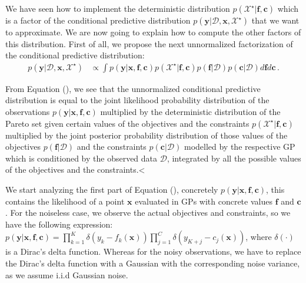 We have seen how to implement the deterministic  distribution $p(\mathcal{X}^{\star}|\textbf{f},\textbf{c})$ which is a factor of the conditional predictive distribution $p(\textbf{y}|\mathcal{D}, \textbf{x}, \mathcal{X}^{\star})$ that we want to approximate. We are now going to explain how to compute the other factors of this distribution. First of all, we propose the next unnormalized factorization of the conditional predictive distribution:
\begin{align}
p(\textbf{y}|\mathcal{D}, \textbf{x}, \mathcal{X}^{\star}) & \propto 
        \int p(\textbf{y}|\textbf{x},\textbf{f},\textbf{c}) 
        p(\mathcal{X}^{\star}|\textbf{f},\textbf{c}) p(\textbf{f}|\mathcal{D}) p(\textbf{c}|\mathcal{D})
 d\textbf{f} d\textbf{c} 
        \label{eq:exact_acq1}\,.
\end{align}

From Equation (\label{eq:exact_acq1}), we see that the unnormalized conditional predictive distribution is equal to the joint likelihood probability distribution of the observations $p(\textbf{y}|\textbf{x},\textbf{f},\textbf{c})$ multiplied by the deterministic distribution of the Pareto set given certain values of the objectives and the constraints $p(\mathcal{X}^{\star}|\textbf{f},\textbf{c})$ multiplied by the joint posterior probability distribution of those values of the objectives $p(\textbf{f}|\mathcal{D})$ and the constraints $p(\textbf{c}|\mathcal{D})$ modelled by the respective GP which is conditioned by the observed data $\mathcal{D}$, integrated by all the possible values of the objectives and the constraints.<

We start analyzing the first part of Equation (\label{eq:exact_acq1}), concretely $p(\textbf{y}|\textbf{x},\textbf{f},\textbf{c})$, this contains the likelihood of a point $\textbf{x}$ evaluated in GPs with concrete values $\textbf{f}$ and $\textbf{c}$. For the noiseless case, we observe the actual objectives and constraints, so we have the following expression:
$p(\textbf{y}|\textbf{x},\textbf{f},\textbf{c}) = \prod_{k=1}^{K}\delta(y_k - 
f_k(\textbf{x})) \prod_{j=1}^{C}\delta (y_{K+j} - c_j(\textbf{x}))$, where $\delta(\cdot)$ is a
Dirac's delta function. Whereas for the noisy observations, we have to replace the Dirac's delta function with a Gaussian with the corresponding noise variance, as we assume i.i.d Gaussian noise.

